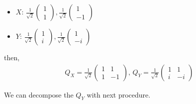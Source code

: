 \begin{itemize}
    \item $X$: $\frac{1}{\sqrt{2}} \begin{pmatrix}
        1 \\
        1
    \end{pmatrix}, \frac{1}{\sqrt{2}} \begin{pmatrix}
        1 \\
        -1
    \end{pmatrix}$
    \item $Y$: $\frac{1}{\sqrt{2}} \begin{pmatrix}
        1 \\
        i
    \end{pmatrix}, \frac{1}{\sqrt{2}} \begin{pmatrix}
        1 \\
        -i
    \end{pmatrix}$
\end{itemize}
then,
\begin{align}
    Q_{X} = \frac{1}{\sqrt{2}} \begin{pmatrix}
        1 & 1\\
        1 & -1
    \end{pmatrix}, \,
    Q_{Y} = \frac{1}{\sqrt{2}} \begin{pmatrix}
        1 & 1\\
        i & -i
    \end{pmatrix}
\end{align}

We can decompose the $Q_{Y}$ with next procedure.

